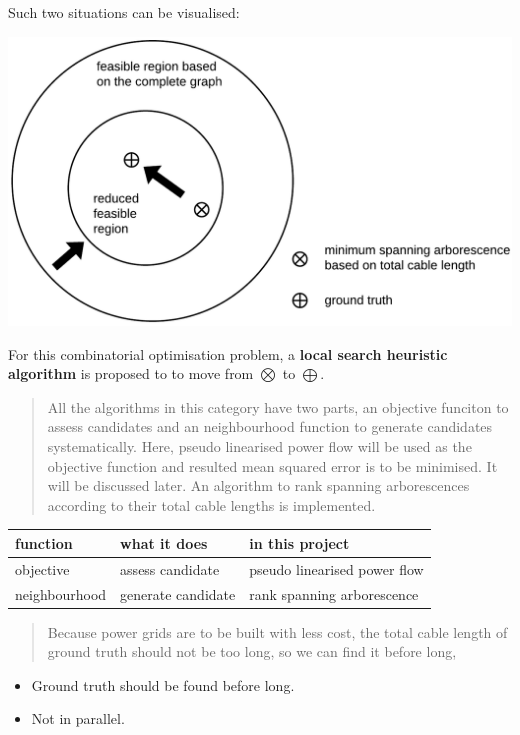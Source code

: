 \documentclass[
]{book}
\providecommand{\tightlist}{%
  \setlength{\itemsep}{0pt}\setlength{\parskip}{0pt}}
\begin{document}
Such two situations can be visualised:

\begin{center}\includegraphics[width=0.7\linewidth]{Pictures/figFeasibleRegion} \end{center}

For this combinatorial optimisation problem, a \textbf{local search heuristic
algorithm} is proposed to to move from \(\bigotimes\) to \(\bigoplus\).
\citep{michiels2007theoretical}

\begin{quote}
All the algorithms in this category have two parts, an objective funciton to
assess candidates and an neighbourhood function to generate candidates
systematically. Here, pseudo linearised power flow will be used as the
objective function and resulted mean squared error is to be minimised. It
will be discussed later. An algorithm to rank spanning arborescences
according to their total cable lengths is implemented.
\end{quote}

\begin{table}[H]
\centering
\begin{tabular}[t]{l|l|l}
\hline
function & what it does & in this project\\
\hline
objective & assess candidate & pseudo linearised power flow\\
\hline
neighbourhood & generate candidate & rank spanning arborescence\\
\hline
\end{tabular}
\end{table}

\begin{quote}
Because power grids are to be built with less cost, the total cable length
of ground truth should not be too long, so we can find it before long,
\end{quote}

\begin{itemize}
\tightlist
\item
  Ground truth should be found before long.
\item
  Not in parallel.
\end{itemize}
\end{document}
